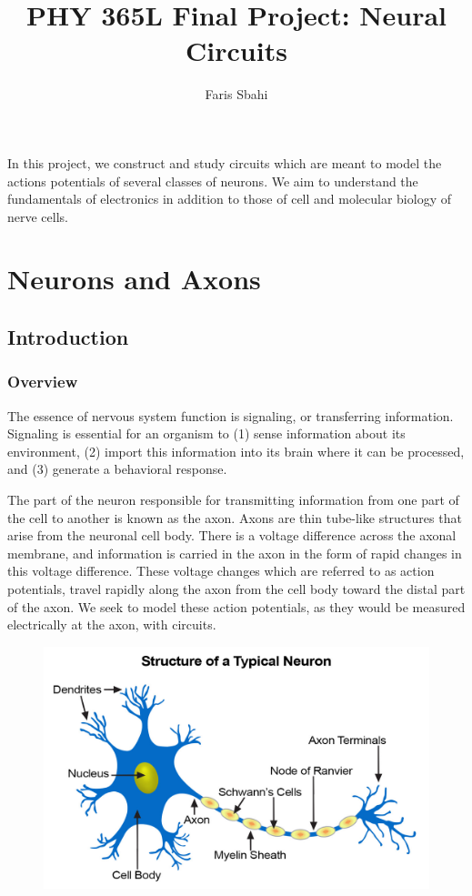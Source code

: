 \documentclass[12]{book}
\title{PHY 365L Final Project: Neural Circuits}
\author{Faris Sbahi}
\newcommand\0{\mathbf{0}}
\newcommand\<{\langle}
\renewcommand\>{\rangle}
\begin{document}
\maketitle


In this project, we construct and study circuits which are meant to model the actions potentials of several classes of neurons. We aim to understand the fundamentals of electronics in addition to those of cell and molecular biology of nerve cells.

\chapter{Neurons and Axons}

\section{Introduction}

\subsection{Overview}

The essence of nervous system function is signaling, or transferring information. Signaling is essential for an organism to (1) sense information about its environment, (2) import this information into its brain where it can be processed, and (3) generate a behavioral response.

The part of the neuron responsible for transmitting information from one part of the cell to another is known as the axon. Axons are thin tube-like structures that arise from the neuronal cell body. There is a voltage difference across the axonal membrane, and information is carried in the axon in the form of rapid changes in this voltage difference. These voltage changes which are referred to as action potentials, travel rapidly along the axon from the cell body toward the distal part of the axon. We seek to model these action potentials, as they would be measured electrically at the axon, with circuits.

\begin{figure}[H]
\centering
\includegraphics{neuron-structure.jpg}
\end{figure}
\end{document}
